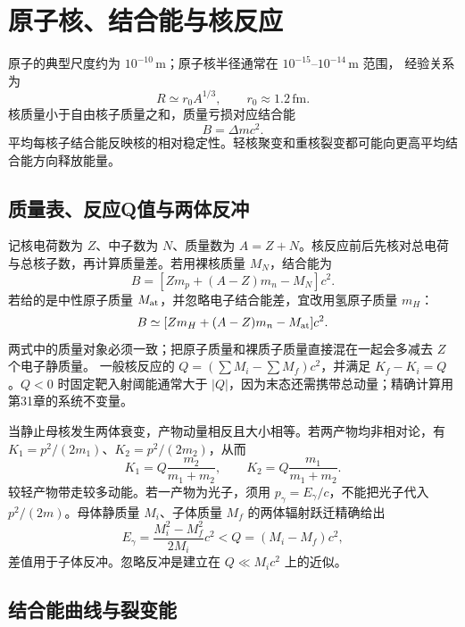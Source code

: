 \begingroup{}

\endgroup

\section{原子核、结合能与核反应}

原子的典型尺度约为 $10^{-10}\,\mathrm m$；原子核半径通常在 $10^{-15}$--$10^{-14}\,\mathrm m$ 范围，
经验关系为
\begin{equation}
 R\simeq r_0A^{1/3},\qquad r_0\approx1.2\,\mathrm{fm}.
\end{equation}
核质量小于自由核子质量之和，质量亏损对应结合能
\begin{equation}
 B=\Delta mc^2.
\end{equation}
平均每核子结合能反映核的相对稳定性。轻核聚变和重核裂变都可能向更高平均结合能方向释放能量。


\subsection{质量表、反应Q值与两体反冲}
记核电荷数为 $Z$、中子数为 $N$、质量数为 $A=Z+N$。核反应前后先核对总电荷与总核子数，再计算质量差。若用裸核质量 $M_N$，结合能为
\[
 B=[Zm_p+(A-Z)m_n-M_N]c^2.
\]
若给的是中性原子质量 $M_{\rm at}$，并忽略电子结合能差，宜改用氢原子质量 $m_H$：
\[
 B\simeq[Zm_H+(A-Z)m_n-M_{\rm at}]c^2.
\]
两式中的质量对象必须一致；把原子质量和裸质子质量直接混在一起会多减去 $Z$ 个电子静质量。
一般核反应的 $Q=(\sum M_i-\sum M_f)c^2$，并满足 $K_f-K_i=Q$。$Q<0$ 时固定靶入射阈能通常大于 $|Q|$，因为末态还需携带总动量；精确计算用第31章的系统不变量。

当静止母核发生两体衰变，产物动量相反且大小相等。若两产物均非相对论，有 $K_1=p^2/(2m_1)$、$K_2=p^2/(2m_2)$，从而
\[
 K_1=Q\frac{m_2}{m_1+m_2},\qquad
 K_2=Q\frac{m_1}{m_1+m_2}.
\]
较轻产物带走较多动能。若一产物为光子，须用 $p_\gamma=E_\gamma/c$，不能把光子代入 $p^2/(2m)$。母体静质量 $M_i$、子体质量 $M_f$ 的两体辐射跃迁精确给出
\[
 E_\gamma=\frac{M_i^2-M_f^2}{2M_i}c^2<Q=(M_i-M_f)c^2,
\]
差值用于子体反冲。忽略反冲是建立在 $Q\ll M_ic^2$ 上的近似。

\subsection{结合能曲线与裂变能}

